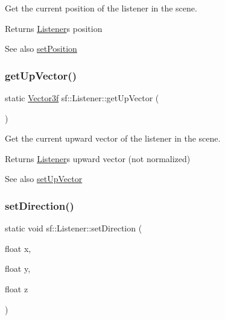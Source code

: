 Get the current position of the listener in the scene. 

\begin{DoxyReturn}{Returns}
\hyperlink{classsf_1_1_listener}{Listener}\textquotesingle{}s position
\end{DoxyReturn}
\begin{DoxySeeAlso}{See also}
\hyperlink{classsf_1_1_listener_a5bc2d8d18ea2d8f339d23cbf17678564}{set\+Position} 
\end{DoxySeeAlso}
\mbox{\label{classsf_1_1_listener_ae1427dd7e9b425b0c23b7b766bd6c6e6}} 
\subsubsection{\texorpdfstring{get\+Up\+Vector()}{getUpVector()}}
{\footnotesize\ttfamily static \hyperlink{classsf_1_1_vector3}{Vector3f} sf\+::\+Listener\+::get\+Up\+Vector (\begin{DoxyParamCaption}{ }\end{DoxyParamCaption})\hspace{0.3cm}{\ttfamily [static]}}



Get the current upward vector of the listener in the scene. 

\begin{DoxyReturn}{Returns}
\hyperlink{classsf_1_1_listener}{Listener}\textquotesingle{}s upward vector (not normalized)
\end{DoxyReturn}
\begin{DoxySeeAlso}{See also}
\hyperlink{classsf_1_1_listener_a0ea9b3083a994b2b90253543bc4e3ad6}{set\+Up\+Vector} 
\end{DoxySeeAlso}
\mbox{\label{classsf_1_1_listener_ae479dc15513c6557984d26e32d06d06e}} 
\subsubsection{\texorpdfstring{set\+Direction()}{setDirection()}\hspace{0.1cm}{\footnotesize\ttfamily [1/2]}}
{\footnotesize\ttfamily static void sf\+::\+Listener\+::set\+Direction (\begin{DoxyParamCaption}\item[{float}]{x,  }\item[{float}]{y,  }\item[{float}]{z }\end{DoxyParamCaption})\hspace{0.3cm}{\ttfamily [static]}}



